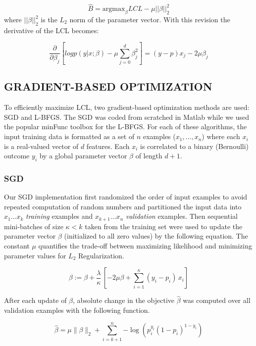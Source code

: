 \begin{equation}
    \hat{B} = \textrm{argmax}_{\beta} LCL - \mu||\beta||_2^2
\end{equation}
where $||\beta||_2^2$ is the $L_2$ norm of the parameter vector. With this revision the derivative of the LCL becomes:

\begin{equation}
    \frac{\partial}{\partial \beta_j} [ log p( y | x ; \beta) -\mu \sum_{j=0}^d \beta_j^2 ] = (y - p) x_j - 2 \mu \beta_j
\end{equation}


\subsection{GRADIENT-BASED OPTIMIZATION}
To efficiently maximize LCL, two gradient-based optimization methods are used: SGD and L-BFGS. The SGD was coded from scratched in Matlab while we used the popular minFunc toolbox \cite{minFunc} for the L-BFGS. For each of these algorithms, the input training data is formatted as a set of $n$ examples ($x_1, \ldots , x_n$) where each $x_i$ is a real-valued vector of $d$ features. Each $x_i$ is correlated to a binary (Bernoulli) outcome $y_i$ by a global parameter vector $\beta$ of length $d+1$. 


\subsubsection{SGD} 
Our SGD implementation first randomized the order of input examples to avoid repeated computation of random numbers and partitioned the input data into $x_1 \ldots x_k$ \emph{training} examples and $x_{k+1} \ldots x_n$ \emph{validation} examples. Then sequential mini-batches of size $\kappa < k$ taken from the training set were used to update the parameter vector $\beta$ (initialized to all zero values) by the following equation. The constant $\mu$ quantifies the trade-off between maximizing likelihood and minimizing parameter values for $L_2$ Regularization.

\begin{equation}
    \beta := \beta + \frac{\lambda}{\kappa}\,[-2 \mu \beta + \sum_{i=1}^{\kappa} (y_i - p_i)\,x_i]
\end{equation}

After each update of $\beta$, absolute change in the objective $\widehat{\beta}$ was computed over all validation examples with the following function.

\begin{equation}
    \widehat{\beta} = \mu \|\beta\|_2 + \sum_{i=k+1}^{n}{-\log(p_i^{y_i}(1 - p_i)^{1-y_i})}
\end{equation}

